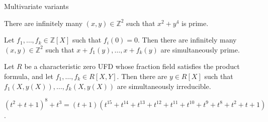 \documentclass[10pt]{beamer}
\begin{document}
\begin{frame}[t]{Multivariate variants}

\begin{theorem}
There are infinitely many $ (x, y) \in \mathbb{Z}^2 $ such that $ x^2 + y^4 $ is prime.
\end{theorem}

\pause

\begin{theorem}
Let $ f_1, \dots, f_k \in \mathbb{Z}[X] $ such that $ f_i(0) = 0 $. Then there are infinitely many $ (x, y) \in \mathbb{Z}^2 $ such that $ x + f_1(y), \dots, x + f_k(y) $ are simultaneously prime.
\end{theorem}

\pause

\begin{theorem}
Let $ R $ be a characteristic zero UFD whose fraction field satisfies the product formula, and let $ f_1, \dots, f_k \in R[X, Y] $. Then there are $ y \in R[X] $ such that $ f_1(X, y(X)), \dots, f_k(X, y(X)) $ are simultaneously irreducible.
\end{theorem}

\pause

\vspace{0.5cm}

\begin{example}
$ (t^2 + t + 1)^8 + t^3 = (t + 1)(t^{15} + t^{14} + t^{13} + t^{12} + t^{11} + t^{10} + t^9 + t^8 + t^2 + t + 1) $.
\end{example}

\end{frame}
\end{document}
